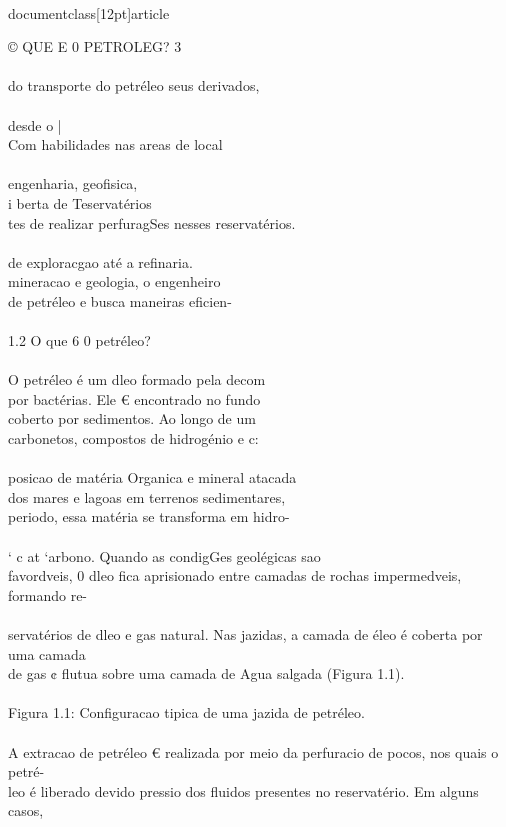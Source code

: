 \\documentclass[12pt]{article}
\begin{document}
{© QUE E 0 PETROLEG? 3\\
\\
do transporte do petréleo seus derivados,\\
\\
desde o |\\
Com habilidades nas areas de local\\
\\
engenharia, geofisica,\\
i berta de Teservatérios\\
tes de realizar perfuragSes nesses reservatérios.\\
\\
de exploracgao até a refinaria.\\
mineracao e geologia, o engenheiro\\
de petréleo e busca maneiras eficien-\\
\\
1.2 O que 6 0 petréleo?\\
\\
O petréleo é um dleo formado pela decom\\
por bactérias. Ele € encontrado no fundo\\
coberto por sedimentos. Ao longo de um\\
carbonetos, compostos de hidrogénio e c:\\
\\
posicao de matéria Organica e mineral atacada\\
dos mares e lagoas em terrenos sedimentares,\\
periodo, essa matéria se transforma em hidro-\\
\\
‘ c at ‘arbono. Quando as condigGes geolégicas sao\\
favordveis, 0 dleo fica aprisionado entre camadas de rochas impermedveis, formando re-\\
\\
servatérios de dleo e gas natural. Nas jazidas, a camada de éleo é coberta por uma camada\\
de gas ¢ flutua sobre uma camada de Agua salgada (Figura 1.1).\\
\\
Figura 1.1: Configuracao tipica de uma jazida de petréleo.\\
\\
A extracao de petréleo € realizada por meio da perfuracio de pocos, nos quais o petré-\\
leo é liberado devido  pressio dos fluidos presentes no reservatério. Em alguns casos,\\
}
\end{document}
